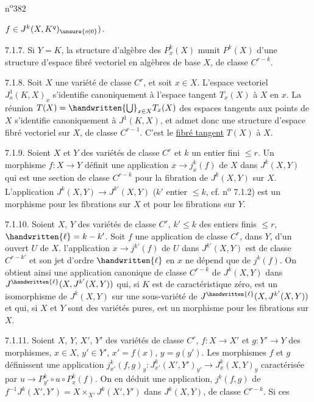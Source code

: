 \hfill n\textsuperscript{o}382

$f\in J^k(X,K^q)_{\unsure{o|0}})$.

7.1.7. Si $Y=K$, la structure d'algèbre des $P^k_x(X)$ munit $P^k(X)$ d'une structure d'espace fibré vectoriel en algèbres de base $X$, de classe $C^{r-k}$.

7.1.8. Soit $X$ une variété de classe $C^r$, et soit $x\in X$. L'espace vectoriel $J^{1}_{o}(K,X)_x$ s'identifie canoniquement à l'espace tangent $T_x(X)$ à $X$ en $x$. La réunion $T(X)=\handwritten{\bigcup}_{x\in X}T_x(X)$ des espaces tangents aux points de $X$ s'identifie canoniquement à $J^{1}(K,X)$, et admet donc une structure d'espace fibré vectoriel sur $X$, de classe $C^{r-1}$. C'est le \uline{fibré tangent} $T(X)$ à $X$.

7.1.9. Soient $X$ et $Y$ des variétés de classe $C^r$ et $k$ un entier fini $\leq r$. Un morphisme $f:X\longrightarrow Y$ définit une application $x\longrightarrow j^k_x(f)$ de $X$ dans $J^k(X,Y)$ qui est une section de classe $C^{r-k}$ pour la fibration de $J^k(X,Y)$ sur $X$. L'application $J^k(X,Y)\longrightarrow J^{k'}(X,Y)$ ($k'$ entier $\leq k$, cf. n\textsuperscript{o} 7.1.2) est un morphisme pour les fibrations sur $X$ et pour les fibrations sur $Y$.

7.1.10. Soient $X$, $Y$ des variétés de classe $C^r$, $k'\leq k$ des entiers finis $\leq r$, $\handwritten{\ell}=k-k'$. Soit $f$ une application de classe $C^r$, dans $Y$, d'un ouvert $U$ de $X$. l'application $x\longrightarrow j^{k'}(f)$ de $U$ dans $J^{k'}(X,Y)$ est de classe $C^{r-k'}$ et son jet d'ordre $\handwritten{\ell}$ en $x$ ne dépend que de $j^k(f)$. On obtient ainsi une application canonique de classe $C^{r-k}$ de $J^k(X,Y)$ dans $J^{\handwritten{\ell}}(X,J^{k'}(X,Y))$ qui, si $K$ est de caractéristique zéro, est un isomorphisme de $J^k(X,Y)$ sur une sous-variété de $J^{\handwritten{\ell}}(X,J^{k'}(X,Y))$ et qui, si $X$ et $Y$ sont des variétés pures, est un morphisme pour les fibrations sur $X$.

7.1.11. Soient $X$, $Y$, $X'$, $Y'$ des variétés de classe $C^r$, $f:X\longrightarrow X'$ et $g:Y'\longrightarrow Y$ des morphismes, $x\in X$, $y'\in Y'$, $x'=f(x)$, $y=g(y')$. Les morphismes $f$ et $g$ définissent une application $j^k_{x'}(f,g)_y:J^k_{x'}(X',Y')_{y'}\longrightarrow J^k_x(X,Y)_y$ caractérisée par $u\longrightarrow P^k_{y'}\circ u\circ P^k_x(f)$. On en déduit une application, $j^k(f,g)$ de $f^{-1}J^k(X',Y')=X\times_{X'}J^k(X',Y')$ dans $J^k(X,Y)$, de classe $C^{r-k}$. Si ces
